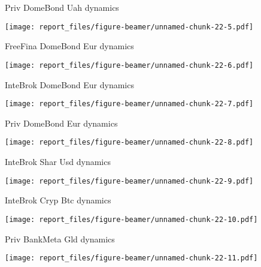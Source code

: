 \documentclass[ignorenonframetext,]{beamer}
\begin{document}
\begin{frame}{Priv DomeBond Uah dynamics}
\protect\hypertarget{priv-domebond-uah-dynamics-1}{}

\texttt{[image: report\_files/figure-beamer/unnamed-chunk-22-5.pdf]}

\end{frame}

\begin{frame}{FreeFina DomeBond Eur dynamics}
\protect\hypertarget{freefina-domebond-eur-dynamics-1}{}

\texttt{[image: report\_files/figure-beamer/unnamed-chunk-22-6.pdf]}

\end{frame}

\begin{frame}{InteBrok DomeBond Eur dynamics}
\protect\hypertarget{intebrok-domebond-eur-dynamics-1}{}

\texttt{[image: report\_files/figure-beamer/unnamed-chunk-22-7.pdf]}

\end{frame}

\begin{frame}{Priv DomeBond Eur dynamics}
\protect\hypertarget{priv-domebond-eur-dynamics-1}{}

\texttt{[image: report\_files/figure-beamer/unnamed-chunk-22-8.pdf]}

\end{frame}

\begin{frame}{InteBrok Shar Usd dynamics}
\protect\hypertarget{intebrok-shar-usd-dynamics-1}{}

\texttt{[image: report\_files/figure-beamer/unnamed-chunk-22-9.pdf]}

\end{frame}

\begin{frame}{InteBrok Cryp Btc dynamics}
\protect\hypertarget{intebrok-cryp-btc-dynamics}{}

\texttt{[image: report\_files/figure-beamer/unnamed-chunk-22-10.pdf]}

\end{frame}

\begin{frame}{Priv BankMeta Gld dynamics}
\protect\hypertarget{priv-bankmeta-gld-dynamics}{}

\texttt{[image: report\_files/figure-beamer/unnamed-chunk-22-11.pdf]}

\end{frame}
\end{document}
